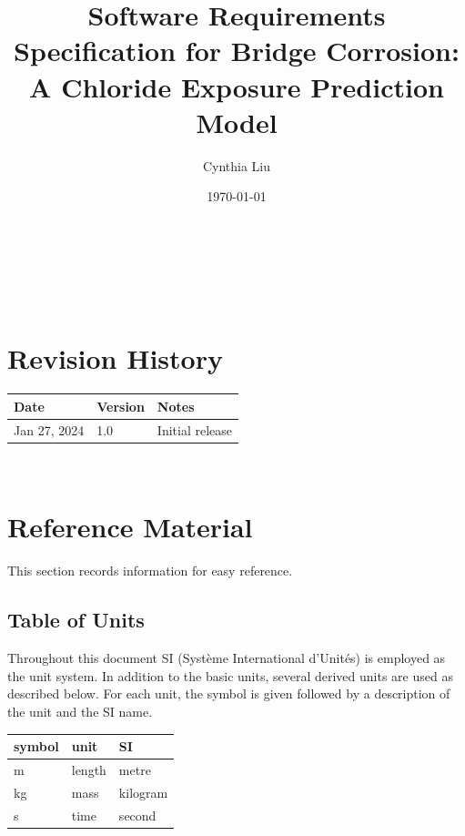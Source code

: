 \documentclass[12pt]{article}
\begin{document}
\title{Software Requirements Specification for Bridge Corrosion: A Chloride Exposure Prediction Model} 
\author{Cynthia Liu}
\date{\today}
	
\maketitle

~\newpage


\tableofcontents

~\newpage

\section*{Revision History}

\begin{tabularx}{\textwidth}{p{3cm}p{2cm}X}
\toprule {\bf Date} & {\bf Version} & {\bf Notes}\\
\midrule
Jan 27, 2024 & 1.0 & Initial release\\
\bottomrule
\end{tabularx}

~\newpage

\section{Reference Material}

This section records information for easy reference.

\subsection{Table of Units}

Throughout this document SI (Syst\`{e}me International d'Unit\'{e}s) is employed
as the unit system.  In addition to the basic units, several derived units are
used as described below.  For each unit, the symbol is given followed by a
description of the unit and the SI name.
~\newline

\renewcommand{\arraystretch}{1.2}
  \noindent \begin{tabular}{l l l} 
    \toprule		
    \textbf{symbol} & \textbf{unit} & \textbf{SI}\\
    \midrule 

    \si{\metre} & length & metre\\
    \si{\kilogram} & mass & kilogram\\
    \si{\second} & time & second\\

    \bottomrule
  \end{tabular}
\end{document}
